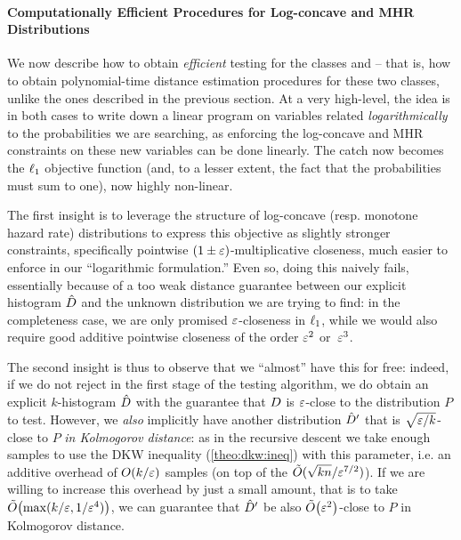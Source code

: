 \paragraph{Computationally Efficient Procedures for Log-concave and MHR Distributions}\label{ssec:efficient:logconcave:mhr}

We now describe how to obtain \emph{efficient} testing for the classes \classlog and \classmhr{} -- that is, how to obtain polynomial-time distance estimation procedures for these two classes, unlike the ones described in the previous section. At a very high-level, the idea is in both cases to write down a linear program on variables related \emph{logarithmically} to the probabilities we are searching, as enforcing the log-concave and MHR constraints on these new variables can be done linearly. The catch now becomes the $\lp[1]$ objective function (and, to a lesser extent, the fact that the probabilities must sum to one), now highly non-linear.

The first insight is to leverage the structure of log-concave (resp. monotone hazard rate) distributions to express this objective as slightly stronger constraints, specifically pointwise $(1\pm\eps)$-multiplicative closeness, much easier to enforce in our ``logarithmic formulation.'' Even so, doing this naively fails, essentially because of a too weak distance guarantee between our explicit histogram $\hat{\D}$ and the unknown distribution we are trying to find: in the completeness case, we are only promised $\eps$-closeness in $\lp[1]$, while we would also require good additive pointwise closeness of the order $\eps^2$ or~$\eps^3$.

The second insight is thus to observe that we ``almost'' have this for free: indeed, if we do not reject in the first stage of the testing algorithm, we do obtain an explicit $k$-histogram $\hat{\D}$ with the guarantee that $\D$ is $\eps$-close to the distribution $P$ to test. However, we \emph{also} implicitly have another distribution $\hat{\D}^\prime$ that is $\sqrt{\eps/k}$-close to $P$ \emph{in Kolmogorov distance}: as in the recursive descent we take enough samples to use the DKW inequality (\cref{theo:dkw:ineq}) with this parameter, i.e. an additive overhead of $\bigO{k/\eps}$ samples (on top of the $\tilde{O}(\sqrt{kn}/\eps^{7/2})$). If we are willing to increase this overhead by just a small amount, that is to take $\tildeO{ \max(k/\eps, 1/\eps^4) }$, we can guarantee that $\hat{\D}^\prime$ be also $\tildeO{\eps^2}$-close to $P$ in Kolmogorov distance.\smallskip

